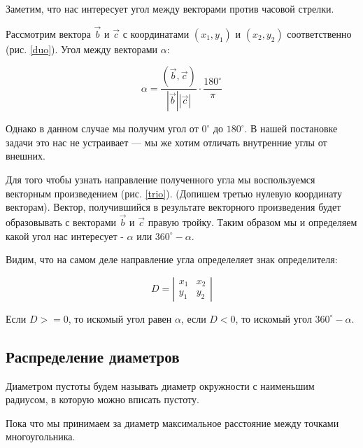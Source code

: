 \documentclass[a4paper, 14pt]{article}
\begin{document}
 	
 	Заметим, что нас интересует угол между векторами против часовой стрелки.
 	
 	Рассмотрим вектора $\overrightarrow b$ и $\overrightarrow c$ с координатами $(x_1, y_1)$ и $(x_2, y_2)$ соответственно (рис. \ref{duo}).
 	Угол между векторами $\alpha$:
 	
 	$$\alpha = \frac{(\overrightarrow b, \overrightarrow c)}{|\overrightarrow b||\overrightarrow c|} \cdot \frac{180^\circ}{\pi}$$
 	
 	Однако в данном случае мы получим угол от $0^\circ$ до $180^\circ$. В нашей постановке задачи это нас не устраивает --- мы же хотим отличать внутренние углы от внешних. 
 	
 	
 	
 	
 	
 	Для того чтобы узнать направление полученного угла мы воспользуемся векторным произведением (рис. \ref{trio}). (Допишем третью нулевую координату векторам). Вектор, получившийся в результате векторного произведения будет образовывать с векторами $\overrightarrow b$ и $\overrightarrow c$ правую тройку. Таким образом мы и определяем какой угол нас интересует - $\alpha$ или $360^\circ - \alpha$. 
 	
 	
 	Видим, что на самом деле направление угла определеляет знак определителя:
 	
 	\begin{equation*}
 		D = \left|
 		\begin{array}{cccc}
 			x_1 & x_2 \\
 			y_1 & y_2 
 		\end{array}
 		\right|
 	\end{equation*}
 	
 	Если $D >=0$, то искомый угол равен $\alpha$, если $D < 0$, то искомый угол $360^\circ - \alpha$.
 	
 	\subsection{Распределение диаметров}
 	
 	Диаметром пустоты будем называть диаметр окружности с наименьшим радиусом, в которую можно вписать пустоту.
 	
 	Пока что мы принимаем за диаметр максимальное расстояние между точками многоугольника.
 	
\end{document}
